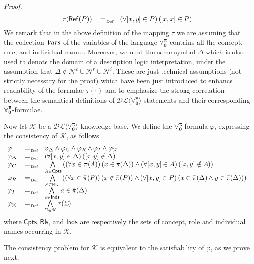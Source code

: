 \documentclass[a4paper,UKenglish]{lipics}
\newcommand{\Lang}{\ensuremath{\mathbf{\forall_{0}^{\pi}}}\xspace}
\newcommand{\nonpairs}[1]{\bar{\pi}(#1)}
\newcommand{\dlLang}{\ensuremath{\mathcal{DL\langle}\Lang\mathcal{\rangle}}\xspace}
\newcommand{\isreflexive}[1]{\mathsf{Ref}(#1)}
\begin{document}
\begin{proof}
\[\begin{array}{rcl}
  \tau(\isreflexive{P}) & \defAs & \left(\forall [x,y] \in P\right)\left( [x,x] \in P\right)\\
 \end{array}
\]
We remark that in the above definition of the mapping $\tau$ we are
assuming that the collection $\mathit{Vars}$ of the variables of the language
\Lang contains all the concept, role, and individual names.  Moreover,
we used the same symbol $\Delta$ which is also used to denote the
domain of a description logic interpretation, under the assumption
that $\Delta \notin \mathcal{N}^c \cup \mathcal{N}^r \cup
\mathcal{N}^i$.  These are just technical assumptions (not strictly
necessary for the proof) which have been just introduced to enhance
readability of the formulae $\tau(\cdot)$ and to emphasize the strong
correlation between the semantical definitions of \dlLang-statements
and their corresponding \Lang-formulae.

Now let $\mathcal{K}$ be a \dlLang-knowledge base.  We define the
\Lang-formula $\varphi$, expressing the consistency of $\mathcal{K}$,
as follows
\[
\begin{array}{lcl}
 \varphi & \defAs &  \varphi_{\Delta} \wedge \varphi_C \wedge \varphi_R \wedge \varphi_I \wedge \varphi_{\mathcal{K}}\\
 \varphi_{\Delta} & \defAs & \left(\forall [x,y] \in \Delta\right)\left([x,y] \notin \Delta\right)\\
 \varphi_C & \defAs & \bigwedge\limits_{A \in \mathsf{Cpts}} \left( \left(\forall x \in \nonpairs{A}\right)\left(x \in \nonpairs{\Delta}\right) \wedge
\left(\forall [x,y] \in A\right)\left([x,y] \notin A\right)\right)\\
 \varphi_R & \defAs & \bigwedge\limits_{P \in \mathsf{Rls\phantom{s}}} \left( \left(\forall x \in \nonpairs{P}\right)\left(x \notin \nonpairs{P}\right) \wedge
\left(\forall [x,y] \in P\right)\left(x \in \nonpairs{\Delta} \wedge y \in \nonpairs{\Delta}\right)\right)\\
 \varphi_I & \defAs & \bigwedge\limits_{a \in \mathsf{Inds}} a \in \nonpairs{\Delta}\\
  \varphi_{\mathcal{K}} & \defAs & \bigwedge\limits_{\Sigma \in \mathcal{K}} \tau(\Sigma)
\end{array}
\]
where $\mathsf{Cpts}, \mathsf{Rls}$, and $\mathsf{Inds}$ are
respectively the sets of concept, role and individual names occurring
in $\mathcal{K}$.

The consistency problem for $\mathcal{K}$ is equivalent to the
satisfiability of $\varphi$, as we prove next.


\end{proof}
\end{document}
